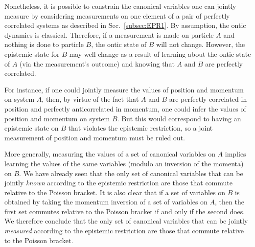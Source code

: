\documentclass[pra,superscriptaddress,nofootinbib,12pt]{revtex4-2}
\begin{document}
Nonetheless, it is possible to constrain the canonical variables one can jointly measure by considering measurements on one element of a pair of perfectly correlated systems as described in Sec.~\ref{subsec:EPR1}.  By assumption, the ontic dynamics is classical.  Therefore, if a measurement is made on particle $A$ and nothing is done to particle $B$, the ontic state of $B$ will not change.  However, the epistemic state for $B$ may well change as a result of learning about the ontic state of $A$ (via the measurement's outcome) and knowing that $A$ and $B$ are perfectly correlated.

For instance, if one could jointly measure the values of position and momentum on system $A$, then, by virtue of the fact that $A$ and $B$ are perfectly correlated in position and perfectly anticorrelated in momentum, one could infer the values of position and momentum on system $B$.  But this would correspond to having an epistemic state on $B$ that violates the epistemic restriction, so a joint measurement of position and momentum must be ruled out.

More generally, measuring the values of a set of canonical variables on $A$ implies learning the values of the same variables (modulo an inversion of the momenta) on $B$.  We have already seen that the only set of canonical variables that can be jointly \emph{known} according to the epistemic restriction are those that commute relative to the Poisson bracket.  It is also clear that if a set of variables on $B$ is obtained by taking the momentum inversion of a set of variables on $A$, then the first set commutes relative to the Poisson bracket if and only if the second does.  We therefore conclude that the only set of canonical variables that can be jointly \emph{measured} according to the epistemic restriction are those that commute relative to the Poisson bracket.




\end{document}
